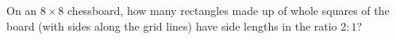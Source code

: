 On an $8\times8$ chessboard, how many rectangles made up of whole squares of the board (with sides along the grid lines) have side lengths in the ratio $2:1$?
